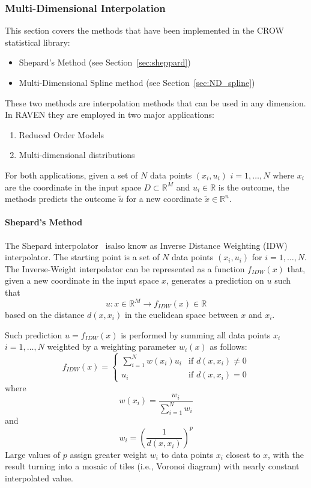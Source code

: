 \subsubsection{Multi-Dimensional Interpolation}
\label{sec:ND_interp}
This section covers the methods that have been implemented in the CROW statistical library:
\begin{itemize}
\item Shepard's Method (see Section~\ref{sec:sheppard})
\item Multi-Dimensional Spline method (see Section~\ref{sec:ND_spline})
\end{itemize}

These two methods are interpolation methods that can be used in any dimension.
In RAVEN they are employed in two major applications:
\begin{enumerate}
\item Reduced Order Models
\item Multi-dimensional distributions
\end{enumerate}
For both applications, given a set of $N$ data points $ (x_i,u_i )$  $i=1,\ldots,N$ where $x_i$ are the coordinate in the input space $D \subset \mathbb{R}^M$ and $u_i \in \mathbb{R}$ is the outcome, the methods predicts the outcome $\tilde{u}$ for a new coordinate $\tilde{x}\in \mathbb{R}^n$.


\paragraph{Shepard's Method}
\label{sec:shepard}
The Shepard interpolator~\cite{Shepard} isalso know as Inverse Distance Weighting (IDW) interpolator. 
The starting point is a set of $N$ data points $ (x_i,u_i )$ for $i=1,\ldots,N$. 
The Inverse-Weight interpolator can be represented as a function $f_{IDW}(x)$ that, given a new coordinate in the input space $x$, generates a prediction on $u$ such that 
\begin{equation}
u:x \in \mathbb{R}^M \rightarrow f_{IDW}(x) \in \mathbb{R}
\end{equation}
based on the distance $d(x,x_i)$ in the euclidean space between $x$ and $x_i$.

Such prediction $u=f_{IDW}(x)$ is performed by summing all data points $x_i$ $i=1,\ldots,N$ weighted by a weighting parameter $w_i (x)$ as follows:
\begin{equation}
f_{IDW}(x) = 
\left\{
\begin{matrix}
\sum_{i=1}^{N} w(x_i) u_i &  \text{if } d(x,x_i) \neq 0 \\
 u_i &  \text{if } d(x,x_i) = 0
\end{matrix}\right.
\end{equation}
where
\begin{equation}
w(x_i) =\frac{w_i}{\sum_{i=1}^{N} w_i}
\end{equation}
and
\begin{equation}
w_i = \left ( \frac{1}{d(x,x_i)} \right )^p
\end{equation}
Large values of $p$ assign greater weight $w_i$ to data points $x_i$ closest to $x$, with the result turning into a mosaic of tiles (i.e., Voronoi diagram) with nearly constant interpolated value.

